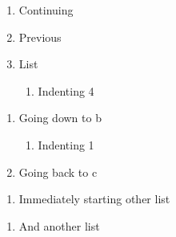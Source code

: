 \documentclass{article}
\begin{document}
	\begin{enumerate}


		\item Continuing



		\item Previous



		\item List

		\begin{enumerate}


			\item Indenting 4


		\end{enumerate}
	\end{enumerate}
	\begin{enumerate}


		\item Going down to b

		\begin{enumerate}


			\item Indenting 1


		\end{enumerate}

		\item Going back to c


	\end{enumerate}
	\begin{enumerate}


		\item Immediately starting other list


	\end{enumerate}
	\begin{enumerate}


		\item And another list


	\end{enumerate}
\end{document}
